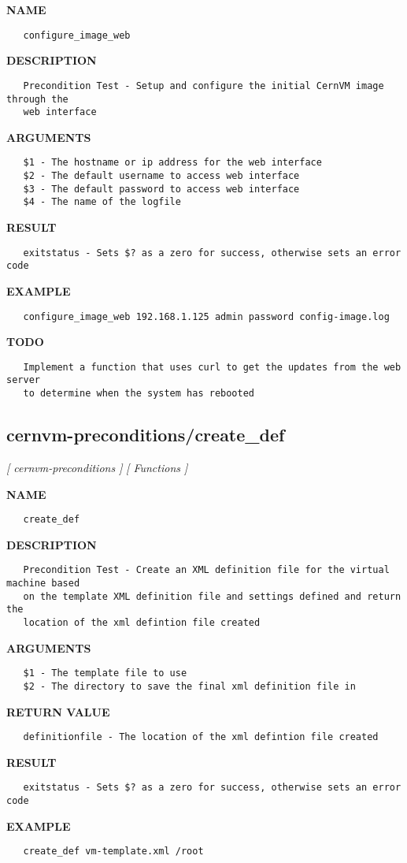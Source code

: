 \label{ch:robo0}
\label{ch:cernvm_preconditions_configure_image_web}
\textbf{NAME}
\begin{verbatim}
   configure_image_web
\end{verbatim}
\textbf{DESCRIPTION}
\begin{verbatim}
   Precondition Test - Setup and configure the initial CernVM image through the
   web interface
\end{verbatim}
\textbf{ARGUMENTS}
\begin{verbatim}
   $1 - The hostname or ip address for the web interface
   $2 - The default username to access web interface
   $3 - The default password to access web interface
   $4 - The name of the logfile
\end{verbatim}
\textbf{RESULT}
\begin{verbatim}
   exitstatus - Sets $? as a zero for success, otherwise sets an error code
\end{verbatim}
\textbf{EXAMPLE}
\begin{verbatim}
   configure_image_web 192.168.1.125 admin password config-image.log
\end{verbatim}
\textbf{TODO}
\begin{verbatim}
   Implement a function that uses curl to get the updates from the web server 
   to determine when the system has rebooted
\end{verbatim}
\newpage
\subsection{cernvm-preconditions/create\_def}
\textsl{[ cernvm-preconditions ]}
\textsl{[ Functions ]}

\label{ch:robo1}
\label{ch:cernvm_preconditions_create_def}
\textbf{NAME}
\begin{verbatim}
   create_def
\end{verbatim}
\textbf{DESCRIPTION}
\begin{verbatim}
   Precondition Test - Create an XML definition file for the virtual machine based
   on the template XML definition file and settings defined and return the
   location of the xml defintion file created
\end{verbatim}
\textbf{ARGUMENTS}
\begin{verbatim}
   $1 - The template file to use
   $2 - The directory to save the final xml definition file in
\end{verbatim}
\textbf{RETURN VALUE}
\begin{verbatim}
   definitionfile - The location of the xml defintion file created
\end{verbatim}
\textbf{RESULT}
\begin{verbatim}
   exitstatus - Sets $? as a zero for success, otherwise sets an error code
\end{verbatim}
\textbf{EXAMPLE}
\begin{verbatim}
   create_def vm-template.xml /root
\end{verbatim}
\newpage
